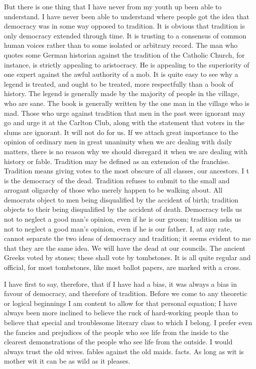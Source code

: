 \documentclass{book}
\begin{document}
But there is one thing that I have never from my youth up been able to understand. I have never been able to understand where people got the idea that democracy was in some way opposed to tradition. It is obvious that tradition is only democracy extended through time. It is trusting to a consensus of common human voices rather than to some isolated or arbitrary record. The man who quotes some German historian against the tradition of the Catholic Church, for instance, is strictly appealing to aristocracy. He is appealing to the superiority of one expert against the awful authority of a mob. It is quite easy to see why a legend is treated, and ought to be treated, more respectfully than a book of history. The legend is generally made by the majority of people in the village, who are sane. The book is generally written by the one man in the village who is mad. Those who urge against tradition that men in the past were ignorant may go and urge it at the Carlton Club, along with the statement that voters in the slums are ignorant. It will not do for us. If we attach great importance to the opinion of ordinary men in great unanimity when we arc dealing with daily matters, there is no reason why we should disregard it when we are dealing with history or fable. Tradition may be defined as an extension of the franchise. Tradition means giving votes to the most obscure of all classes, our ancestors. I t is the democracy of the dead. Tradition refuses to submit to the small and arrogant oligarchy of those who merely happen to be walking about. All democrats object to men being disqualified by the accident of birth; tradition objects to their being disqualified by the accident of death. Democracy tells us not to neglect a good man’s opinion, even if he is our groom; tradition asks us not to neglect a good man’s opinion, even if he is our father. I, at any rate, cannot separate the two ideas of democracy and tradition; it seems evident to me that they are the same idea. We will have the dead at our councils. The ancient Greeks voted by stones; these shall vote by tombstones. It is all quite regular and official, for most tombstones, like most ballot papers, are marked with a cross.

I have first to say, therefore, that if I have had a bias, it was always a bias in favour of democracy, and therefore of tradition. Before we come to any theoretic or logical beginnings I am content to allow for that personal equation; I have always been more inclined to believe the ruck of hard-working people than to believe that special and troublesome literary class to which I belong. I prefer even the fancies and prejudices of the people who see life from the inside to the clearest demonstrations of the people who see life from the outside. I would always trust the old wives. fables against the old maids. facts. As long as wit is mother wit it can be as wild as it pleases.
\end{document}
